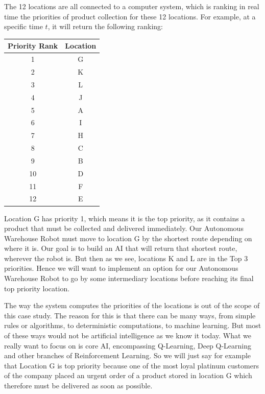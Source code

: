 \documentclass[]{book}
\begin{document}
The 12 locations are all connected to a computer system, which is ranking in real time the priorities of product collection for these 12 locations. For example, at a specific time \(t\), it will return the following ranking:

\begin{table}[h!]
  \begin{center}
    \begin{tabular}{c|c}
      \textbf{Priority Rank} & \textbf{Location} \\
      \hline
      1 & G \\
      2 & K \\
      3 & L \\
      4 & J \\
      5 & A \\
      6 & I \\
      7 & H \\
      8 & C \\
      9 & B \\
      10 & D \\
      11 & F \\
      12 & E \\
    \end{tabular}
  \end{center}
\end{table}

Location G has priority 1, which means it is the top priority, as it contains a product that must be collected and delivered immediately. Our Autonomous Warehouse Robot must move to location G by the shortest route depending on where it is. Our goal is to build an AI that will return that shortest route, wherever the robot is. But then as we see, locations K and L are in the Top 3 priorities. Hence we will want to implement an option for our Autonomous Warehouse Robot to go by some intermediary locations before reaching its final top priority location.

The way the system computes the priorities of the locations is out of the scope of this case study. The reason for this is that there can be many ways, from simple rules or algorithms, to deterministic computations, to machine learning. But most of these ways would not be artificial intelligence as we know it today. What we really want to focus on is core AI, encompassing Q-Learning, Deep Q-Learning and other branches of Reinforcement Learning. So we will just say for example that Location G is top priority because one of the most loyal platinum customers of the company placed an urgent order of a product stored in location G which therefore must be delivered as soon as possible.
\end{document}
